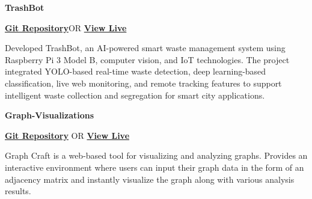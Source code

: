 \documentclass[a4paper]{article}
\begin{document}
    \begin{minipage}{0.6\textwidth}
        \begin{flushleft}
            \textbf{\large TrashBot}
        \end{flushleft}
    \end{minipage}
    \begin{minipage}{0.4\textwidth}
        \begin{flushright}
           \href{https://github.com/pronad1/TrashBot}{\textbf{\faGithub \hspace{0.1cm} Git Repository}}OR \href{https://youtube.com/shorts/o1WTMZHI7-w?si=wVWy2rOleVOKpTV-}{\textbf{\faPaperPlane\hspace{0.1cm}View Live}}
        \end{flushright}
    \end{minipage}
    Developed TrashBot, an AI-powered smart waste management system using Raspberry Pi 3 Model B, computer vision, and IoT technologies. The project integrated YOLO-based real-time waste detection, deep learning-based classification, live web monitoring, and remote tracking features to support intelligent waste collection and segregation for smart city applications.


    \vspace{4pt}
    \begin{minipage}{0.6\textwidth}
        \begin{flushleft}
            \textbf{\large Graph-Visualizations}
        \end{flushleft}
    \end{minipage}
    \begin{minipage}{0.4\textwidth}
        \begin{flushright}
            \href{https://github.com/pronad1/Graph-Visualizations}{\textbf{\faGithub \hspace{0.1cm}Git Repository}} OR \href{https://pronad1.github.io/Graph-Visualizations/}{\textbf{\faPaperPlane\hspace{0.1cm}View Live}}
        \end{flushright}
    \end{minipage}
    Graph Craft is a web-based tool for visualizing and analyzing graphs. Provides an interactive environment where users can input their graph data in the form of an adjacency matrix and instantly visualize the graph along with various analysis results.
\end{document}
